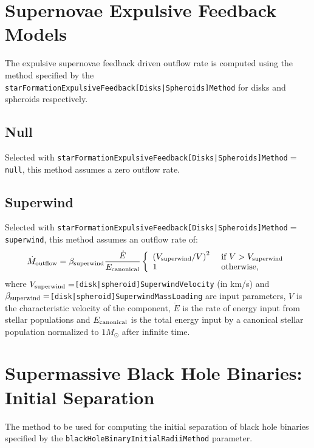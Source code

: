 \section{Supernovae Expulsive Feedback Models}\label{sec:sneExpulsiveFeedback}

The expulsive supernovae feedback driven outflow rate is computed using the method specified by the {\tt starFormationExpulsiveFeedback[Disks|Spheroids]Method} for disks and spheroids respectively.

\subsection{Null}

Selected with {\tt starFormationExpulsiveFeedback[Disks|Spheroids]Method}$=${\tt null}, this method assumes a zero outflow rate.

\subsection{Superwind}

Selected with {\tt starFormationExpulsiveFeedback[Disks|Spheroids]Method}$=${\tt superwind}, this method assumes an outflow rate of:
\begin{equation}
 \dot{M}_{\rm outflow} =  \beta_{\rm superwind} {\dot{E} \over E_{\rm canonical}} \left\{ \begin{array}{ll} \left( V_{\rm superwind}/V\right)^2 & \hbox{ if } V > V_{\rm superwind} \\ 1 & \hbox{ otherwise,} \end{array} \right.
\end{equation}
where $V_{\rm superwind}=${\tt [disk|spheroid]SuperwindVelocity} (in km/s) and $\beta_{\rm superwind}=${\tt [disk|spheroid]SuperwindMassLoading} are input parameters, $V$ is the characteristic velocity of the component, $\dot{E}$ is the rate of energy input from stellar populations and $E_{\rm canonical}$ is the total energy input by a canonical stellar population normalized to $1 M_\odot$ after infinite time.

\section{Supermassive Black Hole Binaries: Initial Separation}

The method to be used for computing the initial separation of black hole binaries specified by the {\tt blackHoleBinaryInitialRadiiMethod} parameter.

